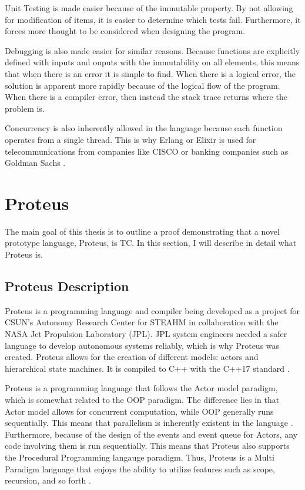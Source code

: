 Unit Testing is made easier because of the immutable property.
By not allowing for modification of items, it is easier to determine which tests fail.
Furthermore, it forces more thought to be considered when designing the program.

Debugging is also made easier for similar reasons.
Because functions are explicitly defined with inputs and ouputs with the immutability on all elements, this means that when there is an error it is simple to find.
When there is a logical error, the solution is apparent more rapidly because of the logical flow of the program.
When there is a compiler error, then instead the stack trace returns where the problem is.

Concurrency is also inherently allowed in the language because each function operates from a single thread.
This is why Erlang or Elixir is used for telecommunications from companies like CISCO or banking companies such as Goldman Sachs \cite{ErlangUses}.

\section{Proteus}\label{sec:Proteus}

The main goal of this thesis is to outline a proof demonstrating that a novel prototype language, Proteus, is TC.
In this section, I will describe in detail what Proteus is.

\subsection{Proteus Description}\label{subsec:ProteusDescription}

Proteus is a programming language and compiler being developed as a project for CSUN's Autonomy Research Center for STEAHM in collaboration with the NASA Jet Propulsion Laboratory (JPL).
JPL system engineers needed a safer language to develop autonomous systems reliably, which is why Proteus was created.
Proteus allows for the creation of different models: actors and hierarchical state machines.
It is compiled to C++ with the C++17 standard \cite{ProteusRunTime}.

Proteus is a programming language that follows the Actor model paradigm, which is somewhat related to the OOP paradigm.
The difference lies in that Actor model allows for concurrent computation, while OOP generally runs sequentially.
This means that parallelism is inherently existent in the language \cite{ActorModelParallel,ActorJavaParallel}.
Furthermore, because of the design of the events and event queue for Actors, any code involving them is run sequentially.
This means that Proteus also supports the Procedural Programming langauge paradigm.
Thus, Proteus is a Multi Paradigm language that enjoys the ability to utilize features such as scope, recursion, and so forth \cite{ProteusPaper}.

